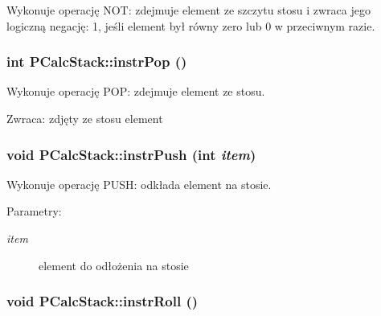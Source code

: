 Wykonuje operację NOT: zdejmuje element ze szczytu stosu i zwraca jego logiczną negację: 1, jeśli element był równy zero lub 0 w przeciwnym razie. \hypertarget{classPCalcStack_796ba40ffc60b05a8a116d881aa2e37f}{
\subsubsection[{instrPop}]{\setlength{\rightskip}{0pt plus 5cm}int PCalcStack::instrPop ()}}
\label{classPCalcStack_796ba40ffc60b05a8a116d881aa2e37f}


Wykonuje operację POP: zdejmuje element ze stosu. \begin{Desc}
\item[Zwraca:]zdjęty ze stosu element \end{Desc}
\hypertarget{classPCalcStack_269ca0f8f0a4395a0035fa0a9bc813a1}{
\subsubsection[{instrPush}]{\setlength{\rightskip}{0pt plus 5cm}void PCalcStack::instrPush (int {\em item})}}
\label{classPCalcStack_269ca0f8f0a4395a0035fa0a9bc813a1}


Wykonuje operację PUSH: odkłada element na stosie. \begin{Desc}
\item[Parametry:]
\begin{description}
\item[{\em item}]element do odłożenia na stosie \end{description}
\end{Desc}
\hypertarget{classPCalcStack_1be80d765fdc530467d76594d94c6746}{
\subsubsection[{instrRoll}]{\setlength{\rightskip}{0pt plus 5cm}void PCalcStack::instrRoll ()}}
\label{classPCalcStack_1be80d765fdc530467d76594d94c6746}


